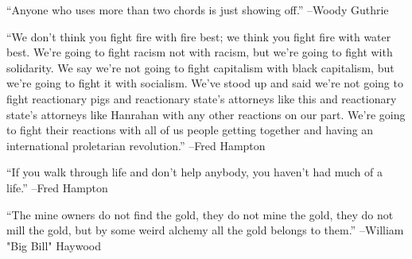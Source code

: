 \documentclass{article}%
\begin{document}
\linebreak%
\vspace{1mm}%
\begin{minipage}{\textwidth}%
\flushleft%
“Anyone who uses more than two chords is just showing off.”%
\linebreak%
\vspace{1mm}%
–Woody Guthrie%
\linebreak%
\vspace{1mm}%
\end{minipage}%
\linebreak%
\vspace{1mm}%
\begin{minipage}{\textwidth}%
\flushleft%
“We don't think you fight fire with fire best; we think you fight fire with water best. We're going to fight racism not with racism, but we're going to fight with solidarity. We say we're not going to fight capitalism with black capitalism, but we're going to fight it with socialism. We've stood up and said we're not going to fight reactionary pigs and reactionary state's attorneys like this and reactionary state's attorneys like Hanrahan with any other reactions on our part. We're going to fight their reactions with all of us people getting together and having an international proletarian revolution.”%
\linebreak%
\vspace{1mm}%
–Fred Hampton%
\linebreak%
\vspace{1mm}%
\end{minipage}%
\linebreak%
\vspace{1mm}%
\begin{minipage}{\textwidth}%
\flushleft%
“If you walk through life and don't help anybody, you haven't had much of a life.”%
\linebreak%
\vspace{1mm}%
–Fred Hampton%
\linebreak%
\vspace{1mm}%
\end{minipage}%
\linebreak%
\vspace{1mm}%
\begin{minipage}{\textwidth}%
\flushleft%
“The mine owners do not find the gold, they do not mine the gold, they do not mill the gold, but by some weird alchemy all the gold belongs to them.”%
\linebreak%
\vspace{1mm}%
–William "Big Bill" Haywood%
\linebreak%
\vspace{1mm}%
\end{minipage}%
\end{document}
